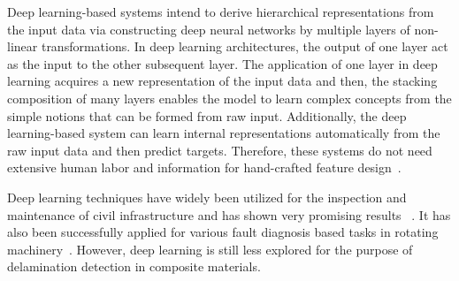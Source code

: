 Deep learning-based systems intend to derive hierarchical representations from the input data via constructing deep neural networks by multiple layers of non-linear transformations. In deep learning architectures, the output of one layer act as the input to the other subsequent layer. The application of one layer in deep learning acquires a new representation of the input data and then, the stacking composition of many layers enables the model to learn complex concepts from the simple notions that can be formed from raw input. Additionally, the deep learning-based system can learn internal representations automatically from the raw input data and then predict targets. Therefore, these systems do not need extensive human labor and information for hand-crafted feature design~\cite{zhao2019deep, yuan2020machine}.

Deep learning techniques have widely been utilized for the inspection and maintenance of civil infrastructure and has shown very promising results ~\cite{cha2017deep, lin2017structural, liu2019computer}. It has also been successfully applied for various fault diagnosis based tasks in rotating machinery~\cite{jia2016deep, janssens2016convolutional}. However, deep learning is still less explored for the purpose of delamination detection in composite materials.   

